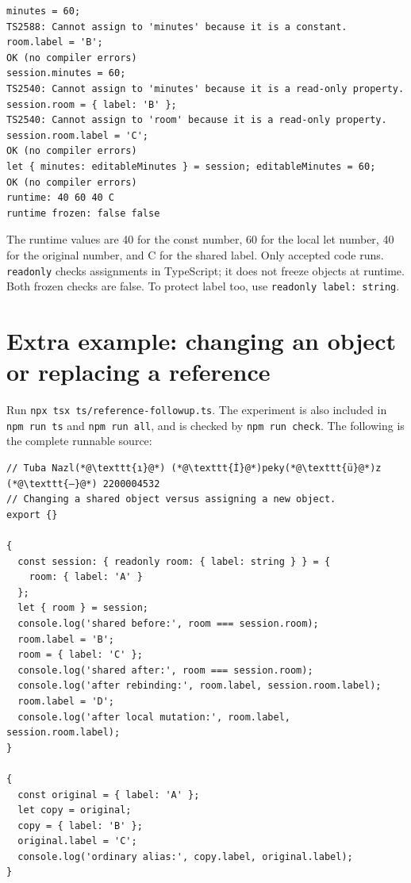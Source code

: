 \documentclass[
  10pt,
  a4paper,
]{article}
\begin{document}
\begin{minipage}{\linewidth}

\begin{lstlisting}
minutes = 60;
TS2588: Cannot assign to 'minutes' because it is a constant.
room.label = 'B';
OK (no compiler errors)
session.minutes = 60;
TS2540: Cannot assign to 'minutes' because it is a read-only property.
session.room = { label: 'B' };
TS2540: Cannot assign to 'room' because it is a read-only property.
session.room.label = 'C';
OK (no compiler errors)
let { minutes: editableMinutes } = session; editableMinutes = 60;
OK (no compiler errors)
runtime: 40 60 40 C
runtime frozen: false false
\end{lstlisting}

\end{minipage}\par

The runtime values are 40 for the const number, 60 for the local let
number, 40 for the original number, and C for the shared label. Only
accepted code runs. \texttt{readonly} checks assignments in TypeScript;
it does not freeze objects at runtime. Both frozen checks are false. To
protect label too, use \texttt{readonly label:\allowbreak{} string}.

\section{Extra example: changing an object or replacing a
reference}\label{extra-example-changing-an-object-or-replacing-a-reference}

Run \texttt{npx tsx ts/\allowbreak{}reference-followup.\allowbreak{}ts}.
The experiment is also included in \texttt{npm run ts} and
\texttt{npm run all}, and is checked by \texttt{npm run check}. The
following is the complete runnable source:

\begin{minipage}{\linewidth}

\begin{lstlisting}
// Tuba Nazl(*@\texttt{ı}@*) (*@\texttt{İ}@*)peky(*@\texttt{ü}@*)z (*@\texttt{—}@*) 2200004532
// Changing a shared object versus assigning a new object.
export {}

{
  const session: { readonly room: { label: string } } = {
    room: { label: 'A' }
  };
  let { room } = session;
  console.log('shared before:', room === session.room);
  room.label = 'B';
  room = { label: 'C' };
  console.log('shared after:', room === session.room);
  console.log('after rebinding:', room.label, session.room.label);
  room.label = 'D';
  console.log('after local mutation:', room.label, session.room.label);
}

{
  const original = { label: 'A' };
  let copy = original;
  copy = { label: 'B' };
  original.label = 'C';
  console.log('ordinary alias:', copy.label, original.label);
}
\end{lstlisting}

\end{minipage}\par
\end{document}
